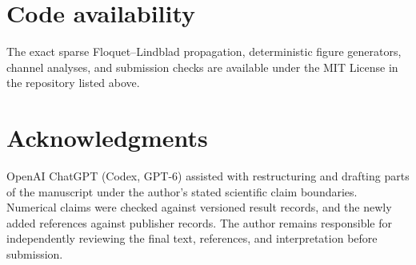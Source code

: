 \documentclass[12pt]{article}
\begin{document}
\section*{Code availability}
The exact sparse Floquet--Lindblad propagation, deterministic figure generators, channel analyses, and submission checks are available under the MIT License in the repository listed above.

\section*{Acknowledgments}
OpenAI ChatGPT (Codex, GPT-6) assisted with restructuring and drafting parts of the manuscript under the author's stated scientific claim boundaries. Numerical claims were checked against versioned result records, and the newly added references against publisher records. The author remains responsible for independently reviewing the final text, references, and interpretation before submission.



\end{document}

